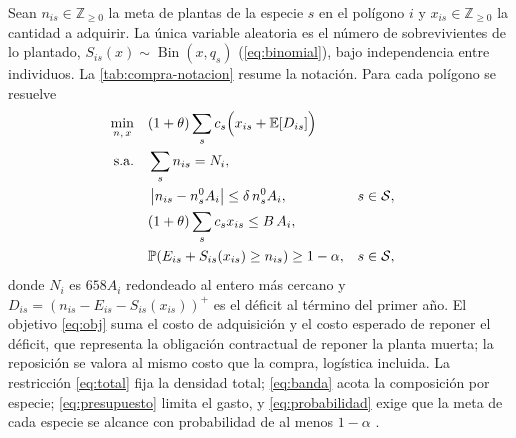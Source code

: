 Sean $n_{is}\in\mathbb{Z}_{\geq0}$ la meta de plantas de la especie $s$ en el polígono $i$ y $x_{is}\in\mathbb{Z}_{\geq0}$ la cantidad a adquirir. La única variable aleatoria es el número de sobrevivientes de lo plantado, $S_{is}(x)\sim\operatorname{Bin}(x,q_s)$ (\cref{eq:binomial}), bajo independencia entre individuos. La \cref{tab:compra-notacion} resume la notación. Para cada polígono se resuelve
\begin{align}
\min_{n,\,x}\quad & (1+\theta)\sum_{s}c_s\Bigl(x_{is}+\mathbb{E}\!\left[D_{is}\right]\Bigr) \label{eq:obj}\\
\text{s.a.}\quad & \sum_{s}n_{is}=N_i, \label{eq:total}\\
& \left|n_{is}-n_s^0A_i\right|\leq\delta\,n_s^0A_i, && s\in\mathcal{S}, \label{eq:banda}\\
& (1+\theta)\sum_{s}c_sx_{is}\leq B\,A_i, \label{eq:presupuesto}\\
& \mathbb{P}\!\left(E_{is}+S_{is}(x_{is})\geq n_{is}\right)\geq1-\alpha, && s\in\mathcal{S}, \label{eq:probabilidad}
\end{align}
donde $N_i$ es $658A_i$ redondeado al entero más cercano y $D_{is}=\left(n_{is}-E_{is}-S_{is}(x_{is})\right)^{+}$ es el déficit al término del primer año. El objetivo \eqref{eq:obj} suma el costo de adquisición y el costo esperado de reponer el déficit, que representa la obligación contractual de reponer la planta muerta; la reposición se valora al mismo costo que la compra, logística incluida. La restricción \eqref{eq:total} fija la densidad total; \eqref{eq:banda} acota la composición por especie; \eqref{eq:presupuesto} limita el gasto, y \eqref{eq:probabilidad} exige que la meta de cada especie se alcance con probabilidad de al menos $1-\alpha$ \autocite{charnes1959}.

